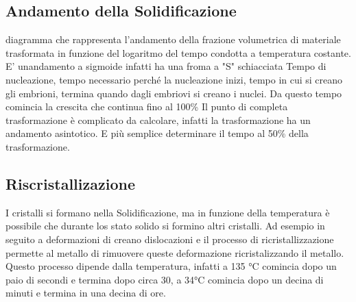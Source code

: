 \documentclass{article}%
\begin{document}
%
\subsection{ Andamento della Solidificazione }%
\label{subsec:AndamentodellaSolidificazione}%
diagramma che rappresenta l'andamento della frazione volumetrica di materiale trasformata in funzione del logaritmo del tempo\newline%
%
condotta a temperatura costante.\newline%
%
\newline%
%
E' unandamento a sigmoide infatti ha una froma a "S" schiacciata\newline%
%
\newline%
%
Tempo di nucleazione, tempo necessario perché la nucleazione inizi, tempo in cui si creano gli embrioni, termina quando dagli embriovi si creano i nuclei.\newline%
%
Da questo tempo comincia la crescita che continua fino al 100\%\newline%
%
Il punto di completa trasformazione è complicato da calcolare, infatti la trasformazione ha un andamento asintotico.\newline%
%
E più semplice determinare il tempo al 50\% della trasformazione.\newline%
%
\newline%

%
\subsection{ Riscristallizazione }%
\label{subsec:Riscristallizazione}%
I cristalli si formano nella Solidificazione, ma in funzione della temperatura è possibile che durante los stato solido si formino altri cristalli.\newline%
%
Ad esempio in seguito a deformazioni di creano dislocazioni e il processo di ricristallizzazione permette al metallo di\newline%
%
rimuovere queste deformazione ricristalizzando il metallo.\newline%
%
\newline%
%
Questo processo dipende dalla temperatura, infatti a 135 °C comincia dopo un paio di secondi e termina dopo circa 30,\newline%
%
a 34°C comincia dopo un decina di minuti e termina in una decina di ore.\newline%

%
\end{document}
